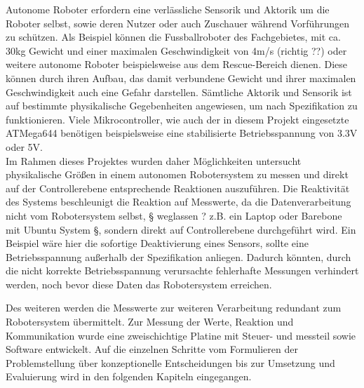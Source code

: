 \documentclass[
	11pt,								%
	a4paper,						%
	oneside,						%
	titlepage,					%
	headsepline,				%
	DIV13,							%
	abstracton,	 				%
	BCOR0cm,						%
	bibliography=totoc, %
]{scrreprt}							%
\begin{document}

Autonome Roboter erfordern eine verlässliche Sensorik und Aktorik um die Roboter selbst, sowie deren Nutzer oder auch Zuschauer während Vorführungen zu
schützen. Als Beispiel können die Fussballroboter des Fachgebietes, mit ca. 30kg Gewicht und einer maximalen Geschwindigkeit
von 4m/s (richtig ??) oder weitere autonome Roboter beispielsweise aus dem Rescue-Bereich dienen. Diese können durch ihren Aufbau, das damit
verbundene Gewicht und ihrer maximalen Geschwindigkeit auch eine Gefahr darstellen. Sämtliche Aktorik und Sensorik ist auf bestimmte physikalische Gegebenheiten angewiesen, um 
nach Spezifikation zu funktionieren. Viele Mikrocontroller, wie auch der in diesem Projekt eingesetzte ATMega644 benötigen beispielsweise eine stabilisierte Betriebsspannung von 3.3V oder 5V.\\
Im Rahmen dieses Projektes wurden daher Möglichkeiten untersucht physikalische Größen
in einem autonomen Robotersystem zu messen und direkt auf der Controllerebene entsprechende Reaktionen auszuführen. Die Reaktivität des Systems beschleunigt die Reaktion auf Messwerte, da die 
Datenverarbeitung nicht vom Robotersystem selbst, § weglassen ? z.B. ein Laptop oder Barebone mit Ubuntu System §, sondern direkt auf Controllerebene durchgeführt wird.
 Ein Beispiel wäre hier die sofortige Deaktivierung eines Sensors, sollte eine Betriebsspannung außerhalb der Spezifikation anliegen.
Dadurch könnten, durch die nicht korrekte Betriebsspannung verursachte fehlerhafte Messungen verhindert werden, noch bevor diese Daten das Robotersystem
erreichen. 

Des weiteren werden die Messwerte zur weiteren Verarbeitung redundant zum Robotersystem übermittelt. Zur Messung der Werte, Reaktion und
Kommunikation wurde eine zweischichtige Platine mit Steuer- und messteil sowie Software entwickelt. Auf die einzelnen Schritte vom Formulieren
der Problemstellung über konzeptionelle Entscheidungen bis zur Umsetzung und Evaluierung wird in den folgenden Kapiteln eingegangen.\\
\end{document}
